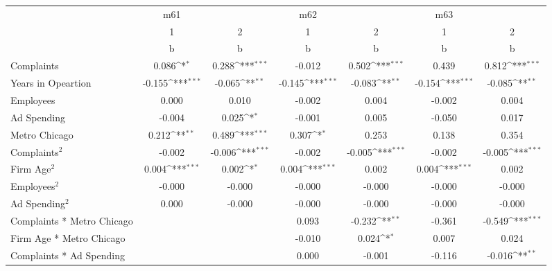 {
\def\sym#1{\ifmmode^{#1}\else\(^{#1}\)\fi}
\begin{tabular}{l*{6}{c}}
\hline\hline
                &      m61         &                  &      m62         &                  &      m63         &                  \\
                &        1         &        2         &        1         &        2         &        1         &        2         \\
                &        b         &        b         &        b         &        b         &        b         &        b         \\
\hline
Complaints      &    0.086\sym{*}  &    0.288\sym{***}&   -0.012         &    0.502\sym{***}&    0.439         &    0.812\sym{***}\\
Years in Opeartion&   -0.155\sym{***}&   -0.065\sym{**} &   -0.145\sym{***}&   -0.083\sym{**} &   -0.154\sym{***}&   -0.085\sym{**} \\
Employees       &    0.000         &    0.010         &   -0.002         &    0.004         &   -0.002         &    0.004         \\
Ad Spending     &   -0.004         &    0.025\sym{*}  &   -0.001         &    0.005         &   -0.050         &    0.017         \\
Metro Chicago   &    0.212\sym{**} &    0.489\sym{***}&    0.307\sym{*}  &    0.253         &    0.138         &    0.354         \\
Complaints$^{2}$&   -0.002         &   -0.006\sym{***}&   -0.002         &   -0.005\sym{***}&   -0.002         &   -0.005\sym{***}\\
Firm Age$^{2}$  &    0.004\sym{***}&    0.002\sym{*}  &    0.004\sym{***}&    0.002         &    0.004\sym{***}&    0.002         \\
Employees$^{2}$ &   -0.000         &   -0.000         &   -0.000         &   -0.000         &   -0.000         &   -0.000         \\
Ad Spending$^{2}$&    0.000         &   -0.000         &   -0.000         &   -0.000         &   -0.000         &   -0.000         \\
Complaints * Metro Chicago&                  &                  &    0.093         &   -0.232\sym{**} &   -0.361         &   -0.549\sym{***}\\
Firm Age * Metro Chicago&                  &                  &   -0.010         &    0.024\sym{*}  &    0.007         &    0.024         \\
Complaints * Ad Spending&                  &                  &    0.000         &   -0.001         &   -0.116         &   -0.016\sym{**} \\

\end{tabular}}
